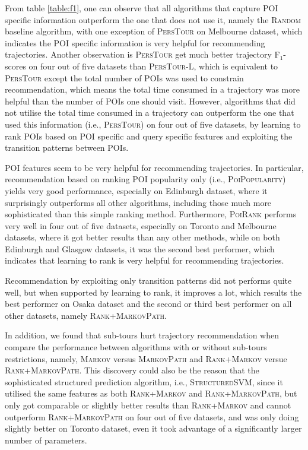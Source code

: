 From table \ref{table:f1}, one can observe that all algorithms that capture POI specific information
outperform the one that does not use it, namely the \textsc{Random} baseline algorithm,
with one exception of \textsc{PersTour} on Melbourne dataset,
which indicates the POI specific information is very helpful for recommending trajectories.
%
Another observation is \textsc{PersTour} get much better trajectory F$_1$-scores on four out of five datasets
than \textsc{PersTour-L}, which is equivalent to \textsc{PersTour} except the total number of POIs was used to
constrain recommendation, which means the total time consumed in a trajectory was more helpful than the number
of POIs one should visit.
%
However, algorithms that did not utilise the total time consumed in a trajectory can outperform the one that
used this information (i.e., \textsc{PersTour}) on four out of five datasets,
by learning to rank POIs based on POI specific and query specific features and exploiting the transition patterns
between POIs.

POI features seem to be very helpful for recommending trajectories.
In particular, recommendation based on ranking POI popularity only
(i.e., \textsc{PoiPopularity}) yields very good performance,
especially on Edinburgh dataset, where it surprisingly outperforms all
other algorithms, including those much more sophisticated than this simple ranking method.
%
Furthermore, \textsc{PoiRank} performs very well in four out of five datasets,
especially on Toronto and Melbourne datasets, where it got better results than any other methods,
while on both Edinburgh and Glasgow datasets, it was the second best performer,
which indicates that learning to rank is very helpful for recommending trajectories.

Recommendation by exploiting only transition patterns did not performs quite well,
but when supported by learning to rank, it improves a lot, which results the best performer on Osaka dataset
and the second or third best performer on all other datasets, namely \textsc{Rank+MarkovPath}.

In addition, we found that sub-tours hurt trajectory recommendation when compare the performance between
algorithms with or without sub-tours restrictions, namely, \textsc{Markov} versus \textsc{MarkovPath} and
\textsc{Rank+Markov} versue \textsc{Rank+MarkovPath}.
%
This discovery could also be the reason that the sophisticated structured prediction algorithm,
i.e., \textsc{StructuredSVM}, since it utilised the same features as both \textsc{Rank+Markov} and
\textsc{Rank+MarkovPath}, but only got comparable or slightly better results than \textsc{Rank+Markov}
and cannot outperform \textsc{Rank+MarkovPath} on four out of five datasets, and was only doing slightly
better on Toronto dataset, even it took advantage of a significantly larger number of parameters.

